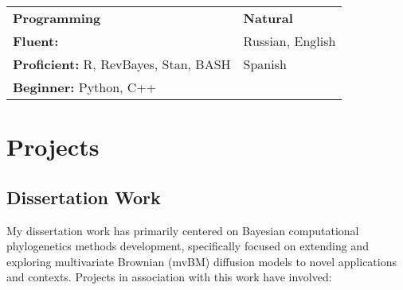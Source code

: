 \documentclass[12pt]{article}
\begin{document}
\noindent\begin{tabular}{@{}ll}
\hspace{2cm} \textbf{Programming}         & \hspace{3cm}                          \textbf{Natural}\\
\textbf{Fluent:} & \hspace{3cm} Russian, English\\
\textbf{Proficient:} R, RevBayes, Stan, BASH &  \hspace{3cm} Spanish\\
\textbf{Beginner:}  \hspace{0.035cm} Python, C++ &  \hspace{3cm} \\

\end{tabular}

\section{Projects}

\subsection{Dissertation Work}

My dissertation work has primarily centered on Bayesian computational phylogenetics methods development, specifically focused on extending and exploring multivariate Brownian (mvBM) diffusion models to novel applications and contexts. Projects in association with this work have involved:
\end{document}
